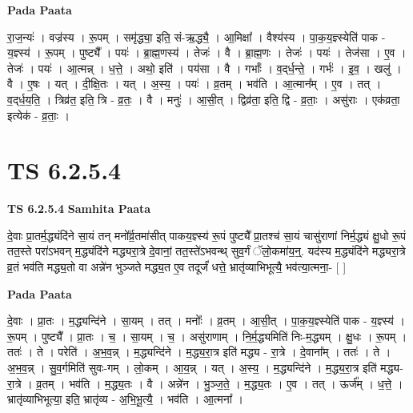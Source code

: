 \documentclass[17pt]{extarticle}
\begin{document}
\textbf{Pada Paata} \newline

रा॒ज॒न्यः॑ । वज्र॑स्य । रू॒पम् । समृ॑द्ध्या॒ इति॒ सं-ऋ॒द्ध्यै॒ । आ॒मिक्षा᳚ । वैश्य॑स्य । पा॒क॒य॒ज्ञ्स्येति॑ पाक - य॒ज्ञ्स्य॑ । रू॒पम् । पुष्ट्यै᳚ । पयः॑ । ब्रा॒ह्म॒णस्य॑ । तेजः॑ । वै । ब्रा॒ह्म॒णः । तेजः॑ । पयः॑ । तेज॑सा । ए॒व । तेजः॑ । पयः॑ । आ॒त्मन्न् । ध॒त्ते॒ । अथो॒ इति॑ । पय॑सा । वै । गर्भाः᳚ । व॒द्‌र्ध॒न्ते॒ । गर्भः॑ । इ॒व॒ । खलु॑ । वै । ए॒षः । यत् । दी॒क्षि॒तः । यत् । अ॒स्य॒ । पयः॑ । व्र॒तम् । भव॑ति । आ॒त्मान᳚म् । ए॒व । तत् । व॒द्‌र्ध॒य॒ति॒ । त्रिव्र॑त॒ इति॒ त्रि - व्र॒तः॒ । वै । मनुः॑ । आ॒सी॒त् । द्विव्र॑ता॒ इति॒ द्वि - व्र॒ताः॒ । असु॑राः । एक॑व्रता॒ इत्येक॑ - व्र॒ताः॒ ।  \newline





\section{ TS 6.2.5.4 }

\textbf{TS 6.2.5.4 } \newline
\textbf{Samhita Paata} \newline

दे॒वाः प्रा॒तर्म॒द्ध्यंदि॑ने सा॒यं तन् मनो᳚र्व्र॒तमा॑सीत् पाकय॒ज्ञ्स्य॑ रू॒पं पुष्ट्यै᳚ प्रा॒तश्च॑ सा॒यं चासु॑राणां निर्म॒द्ध्यं क्षु॒धो रू॒पं तत॒स्ते परा॑ऽभवन् म॒द्ध्यंदि॑ने मद्ध्यरा॒त्रे दे॒वानां॒ तत॒स्ते॑ऽभवन्थ् सुव॒र्गं ॅलो॒कमा॑य॒न्॒. यद॑स्य म॒द्ध्यंदि॑ने मद्ध्यरा॒त्रे व्र॒तं भव॑ति मद्ध्य॒तो वा अन्ने॑न भुञ्जते मद्ध्य॒त ए॒व तदूर्जं॑ धत्ते॒ भ्रातृ॑व्याभिभूत्यै॒ भव॑त्या॒त्मना॒- [  ] \newline

\textbf{Pada Paata} \newline

दे॒वाः । प्रा॒तः । म॒द्ध्यन्दि॑ने । सा॒यम् । तत् । मनोः᳚ । व्र॒तम् । आ॒सी॒त् । पा॒क॒य॒ज्ञ्स्येति॑ पाक - य॒ज्ञ्स्य॑ । रू॒पम् । पुष्ट्यै᳚ । प्रा॒तः । च॒ । सा॒यम् । च॒ । असु॑राणाम् । नि॒र्म॒द्ध्यमिति॑ निः-म॒द्ध्यम् । क्षु॒धः । रू॒पम् । ततः॑ । ते । परेति॑ । अ॒भ॒व॒न्न् । म॒द्ध्यन्दि॑ने । म॒द्ध्य॒रा॒त्र इति॑ मद्ध्य - रा॒त्रे । दे॒वाना᳚म् । ततः॑ । ते । अ॒भ॒व॒न्न् । सु॒व॒र्गमिति॑ सुवः-गम् । लो॒कम् । आ॒य॒न्न् । यत् । अ॒स्य॒ । म॒द्ध्यन्दि॑ने । म॒द्ध्य॒रा॒त्र इति॑ मद्ध्य-रा॒त्रे । व्र॒तम् । भव॑ति । म॒द्ध्य॒तः । वै । अन्ने॑न । भु॒ञ्ज॒ते॒ । म॒द्ध्य॒तः । ए॒व । तत् । ऊर्ज᳚म् । ध॒त्ते॒ । भ्रातृ॑व्याभिभूत्या॒ इति॒ भ्रातृ॑व्य - अ॒भि॒भू॒त्यै॒ । भव॑ति । आ॒त्मना᳚ ।  \newline
\end{document}
